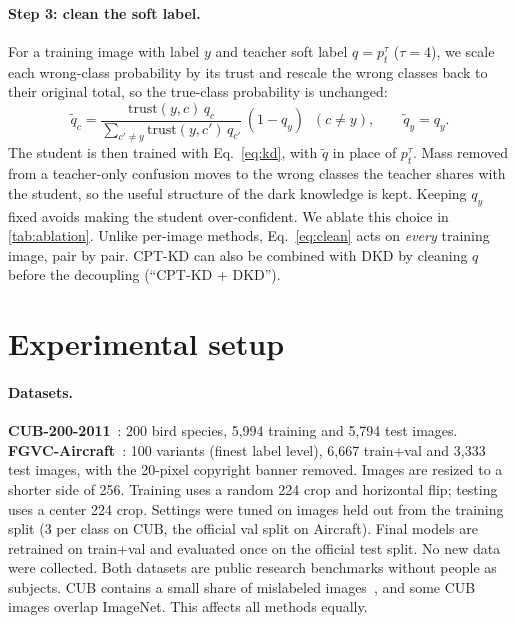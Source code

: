 \documentclass[10pt,twocolumn,letterpaper]{article}
\newcommand{\trust}{\mathrm{trust}}
\begin{document}
\paragraph{Step 3: clean the soft label.} For a training image with label $y$ and teacher soft label $q=p_t^{\tau}$ ($\tau{=}4$), we scale each wrong-class probability by its trust and rescale the wrong classes back to their original total, so the true-class probability is unchanged:
\begin{equation}
\tilde q_c = \frac{\trust(y,c)\,q_c}{\sum_{c'\neq y}\trust(y,c')\,q_{c'}}\,(1-q_y)\;\;(c\neq y),\qquad \tilde q_y=q_y .
\label{eq:clean}
\end{equation}
The student is then trained with Eq.~\eqref{eq:kd}, with $\tilde q$ in place of $p_t^{\tau}$. Mass removed from a teacher-only confusion moves to the wrong classes the teacher shares with the student, so the useful structure of the dark knowledge is kept. Keeping $q_y$ fixed avoids making the student over-confident. We ablate this choice in \cref{tab:ablation}. Unlike per-image methods, Eq.~\eqref{eq:clean} acts on \emph{every} training image, pair by pair. CPT-KD can also be combined with DKD by cleaning $q$ before the decoupling (``CPT-KD + DKD'').

\section{Experimental setup}
\label{sec:setup}
\paragraph{Datasets.} \textbf{CUB-200-2011}~\cite{wah2011cub}: 200 bird species, 5{,}994 training and 5{,}794 test images. \textbf{FGVC-Aircraft}~\cite{maji2013aircraft}: 100 variants (finest label level), 6{,}667 train+val and 3{,}333 test images, with the 20-pixel copyright banner removed. Images are resized to a shorter side of 256. Training uses a random 224 crop and horizontal flip; testing uses a center 224 crop. Settings were tuned on images held out from the training split (3 per class on CUB, the official val split on Aircraft). Final models are retrained on train+val and evaluated once on the official test split. No new data were collected. Both datasets are public research benchmarks without people as subjects. CUB contains a small share of mislabeled images~\cite{vanhorn2015building}, and some CUB images overlap ImageNet. This affects all methods equally.
\end{document}
